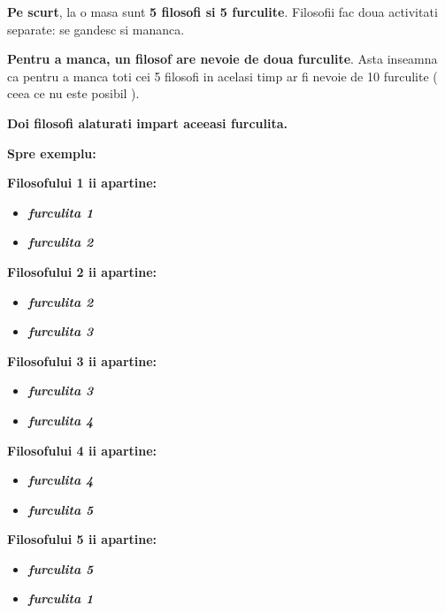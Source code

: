 \documentclass[14pt]{article}
\begin{document}
\textbf{Pe scurt}, la o masa sunt \textbf{5 filosofi si 5 furculite}. Filosofii fac doua activitati separate: se gandesc si mananca. 

\vspace{2 mm}

\textbf{Pentru a manca, un filosof are nevoie de doua furculite}. Asta inseamna ca pentru a manca toti cei 5 filosofi in acelasi timp ar fi nevoie de 10 furculite ( ceea ce nu este posibil ). 

\vspace{2 mm}

\textbf{Doi filosofi alaturati impart aceeasi furculita.}

\vspace{2 mm}

\textbf{Spre exemplu:}

\vspace{2 mm}

\textbf{Filosofului 1 ii apartine:}
\begin{itemize}
\item \textbf{\textit{furculita 1}}
\item \textbf{\textit{furculita 2}}
\end{itemize}


\textbf{Filosofului 2 ii apartine:}
\begin{itemize}
\item \textbf{\textit{furculita 2}}
\item \textbf{\textit{furculita 3}}
\end{itemize}


\textbf{Filosofului 3 ii apartine:}
\begin{itemize}
\item \textbf{\textit{furculita 3}}
\item \textbf{\textit{furculita 4}}
\end{itemize}


\textbf{Filosofului 4 ii apartine:}
\begin{itemize}
\item \textbf{\textit{furculita 4}}
\item \textbf{\textit{furculita 5}}
\end{itemize}


\textbf{Filosofului 5 ii apartine:}
\begin{itemize}
\item \textbf{\textit{furculita 5}}
\item \textbf{\textit{furculita 1}}
\end{itemize}
\end{document}

